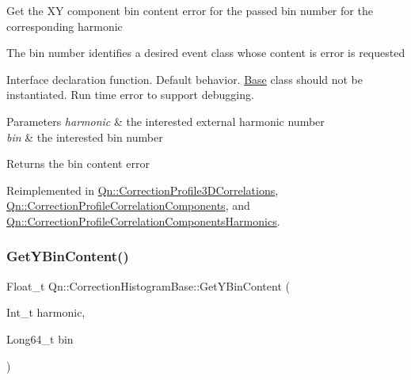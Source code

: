 Get the XY component bin content error for the passed bin number for the corresponding harmonic

The bin number identifies a desired event class whose content is error is requested

Interface declaration function. Default behavior. \mbox{\hyperlink{classBase}{Base}} class should not be instantiated. Run time error to support debugging.


\begin{DoxyParams}{Parameters}
{\em harmonic} & the interested external harmonic number \\
\hline
{\em bin} & the interested bin number \\
\hline
\end{DoxyParams}
\begin{DoxyReturn}{Returns}
the bin content error 
\end{DoxyReturn}


Reimplemented in \mbox{\hyperlink{classQn_1_1CorrectionProfile3DCorrelations_a44be0e49b21d3e4528d65e0c7398ddd0}{Qn\+::\+Correction\+Profile3\+D\+Correlations}}, \mbox{\hyperlink{classQn_1_1CorrectionProfileCorrelationComponents_a1d3376133250c6af3e93441d19aebc1b}{Qn\+::\+Correction\+Profile\+Correlation\+Components}}, and \mbox{\hyperlink{classQn_1_1CorrectionProfileCorrelationComponentsHarmonics_ac3aada46be56f35fa487ed621889b121}{Qn\+::\+Correction\+Profile\+Correlation\+Components\+Harmonics}}.

\mbox{\label{classQn_1_1CorrectionHistogramBase_acc898b8b375f88d0625798d3b9a9b9ba}} 
\subsubsection{\texorpdfstring{Get\+Y\+Bin\+Content()}{GetYBinContent()}}
{\footnotesize\ttfamily Float\+\_\+t Qn\+::\+Correction\+Histogram\+Base\+::\+Get\+Y\+Bin\+Content (\begin{DoxyParamCaption}\item[{Int\+\_\+t}]{harmonic,  }\item[{Long64\+\_\+t}]{bin }\end{DoxyParamCaption})\hspace{0.3cm}{\ttfamily [virtual]}}

